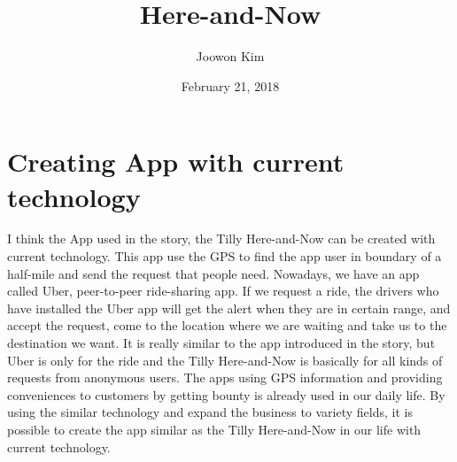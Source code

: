 \documentclass[12pt]{article}
\begin{document}
\title{Here-and-Now}
\author{Joowon Kim}
\date{February 21, 2018}
\maketitle
\section{Creating App with current technology}
I think the App used in the story, the Tilly Here-and-Now\cite{app} can be created with current technology. This app use the GPS to find the app user in boundary of a half-mile and send the request that people need. Nowadays, we have an app called Uber\cite{uber}, peer-to-peer ride-sharing app. If we request a ride, the drivers who have installed the Uber app will get the alert when they are in certain range, and accept the request, come to the location where we are waiting and take us to the destination we want. It is really similar to the app introduced in the story, but Uber is only for the ride and the Tilly Here-and-Now is basically for all kinds of requests from anonymous users. The apps using GPS information and providing conveniences to customers by getting bounty is already used in our daily life. By using the similar technology and expand the business to variety fields, it is possible to create the app similar as the Tilly Here-and-Now in our life with current technology. 
\end{document}
